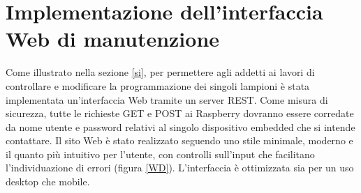 \section{Implementazione dell'interfaccia Web di manutenzione}
Come illustrato nella sezione \ref{si}, per permettere agli addetti ai lavori di controllare e modificare la programmazione dei singoli lampioni è stata implementata un'interfaccia Web tramite un server REST.
Come misura di sicurezza, tutte le richieste GET e POST ai Raspberry dovranno essere corredate da nome utente e password relativi al singolo dispositivo embedded che si intende contattare.
Il sito Web è stato realizzato seguendo uno stile minimale, moderno e il quanto più intuitivo per l'utente, con controlli sull'input che facilitano l'individuazione di errori (figura \ref{WD}).
L'interfaccia è ottimizzata sia per un uso desktop che mobile.
